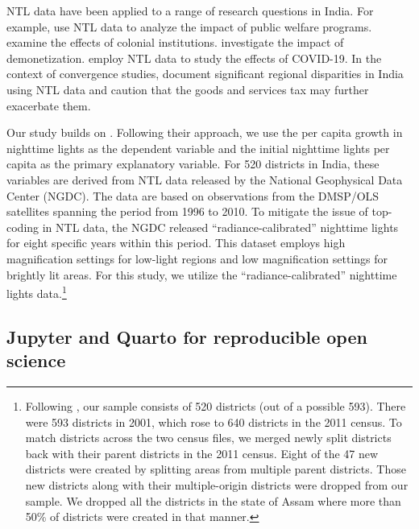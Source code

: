 \documentclass[
  a4paper, 
  twoside,
  review
]{article}
\begin{document}
NTL data have been applied to a range of research questions in India.
For example, \citet{cook_shah_nregs} use NTL data to analyze the impact
of public welfare programs. \citet{jha_talathi_colonial_india} examine
the effects of colonial institutions. \citet{chanda_cook_demonetization}
investigate the impact of demonetization. \citet{beyer_jain_sinha_covid}
employ NTL data to study the effects of COVID-19. In the context of
convergence studies, \citet{chakravarty_dehejia_gst} document
significant regional disparities in India using NTL data and caution
that the goods and services tax may further exacerbate them.

Our study builds on \citet{chanda_kabiraj_district_convergence}.
Following their approach, we use the per capita growth in nighttime
lights as the dependent variable and the initial nighttime lights per
capita as the primary explanatory variable. For 520 districts in India,
these variables are derived from NTL data released by the National
Geophysical Data Center (NGDC). The data are based on observations from
the DMSP/OLS satellites spanning the period from 1996 to 2010. To
mitigate the issue of top-coding in NTL data, the NGDC released
``radiance-calibrated'' nighttime lights for eight specific years within
this period. This dataset employs high magnification settings for
low-light regions and low magnification settings for brightly lit areas.
For this study, we utilize the ``radiance-calibrated'' nighttime lights
data.\footnote{Following \citet{chanda_kabiraj_district_convergence},
  our sample consists of 520 districts (out of a possible 593). There
  were 593 districts in 2001, which rose to 640 districts in the 2011
  census. To match districts across the two census files, we merged
  newly split districts back with their parent districts in the 2011
  census. Eight of the 47 new districts were created by splitting areas
  from multiple parent districts. Those new districts along with their
  multiple-origin districts were dropped from our sample. We dropped all
  the districts in the state of Assam where more than 50\% of districts
  were created in that manner.}

\subsection{Jupyter and Quarto for reproducible open
science}\label{jupyter-and-quarto-for-reproducible-open-science}
\end{document}
